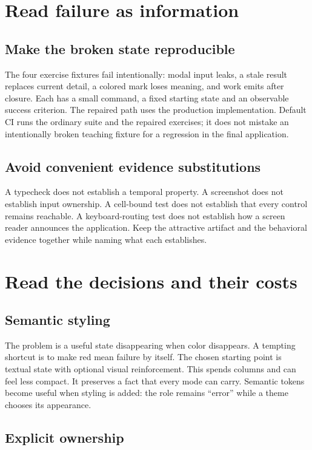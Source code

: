 \section{Read failure as information}

\subsection{Make the broken state reproducible}

The four exercise fixtures fail intentionally: modal input leaks, a stale result replaces current detail, a colored mark loses meaning, and work emits after closure. Each has a small command, a fixed starting state and an observable success criterion. The repaired path uses the production implementation. Default CI runs the ordinary suite and the repaired exercises; it does not mistake an intentionally broken teaching fixture for a regression in the final application.

\subsection{Avoid convenient evidence substitutions}

A typecheck does not establish a temporal property. A screenshot does not establish input ownership. A cell-bound test does not establish that every control remains reachable. A keyboard-routing test does not establish how a screen reader announces the application. Keep the attractive artifact and the behavioral evidence together while naming what each establishes.

\section{Read the decisions and their costs}

\subsection{Semantic styling}

The problem is a useful state disappearing when color disappears. A tempting shortcut is to make red mean failure by itself. The chosen starting point is textual state with optional visual reinforcement. This spends columns and can feel less compact. It preserves a fact that every mode can carry. Semantic tokens become useful when styling is added: the role remains ``error'' while a theme chooses its appearance.

\subsection{Explicit ownership}

